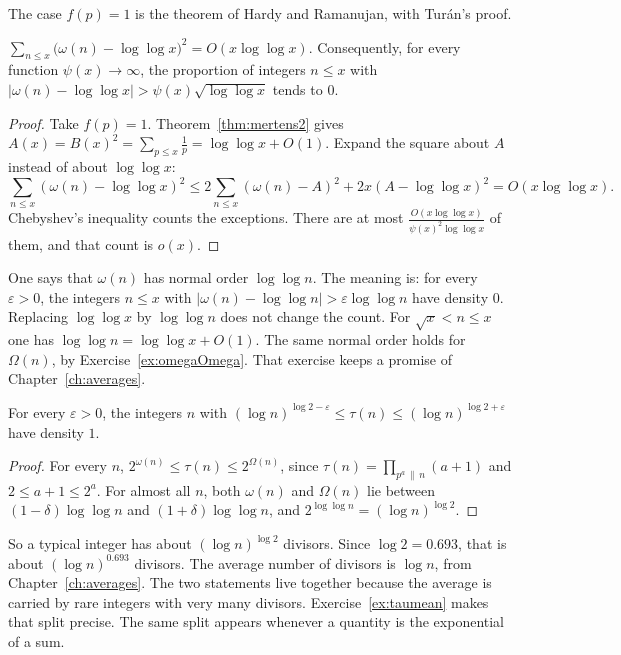 The case $f(p)=1$ is the theorem of Hardy and Ramanujan, with Turán's proof.

\begin{theorem}\label{thm:hr}
$\displaystyle\sum_{n\le x}\bigl(\omega(n)-\log\log x\bigr)^2=O(x\log\log x)$. Consequently, for every function $\psi(x)\to\infty$, the proportion of integers $n\le x$ with $|\omega(n)-\log\log x|>\psi(x)\sqrt{\log\log x}$ tends to $0$.
\end{theorem}
\begin{proof}
Take $f(p)=1$. Theorem~\ref{thm:mertens2} gives $A(x)=B(x)^2=\sum_{p\le x}\frac1p=\log\log x+O(1)$. Expand the square about $A$ instead of about $\log\log x$:
\[
\sum_{n\le x}(\omega(n)-\log\log x)^2\le 2\sum_{n\le x}(\omega(n)-A)^2+2x(A-\log\log x)^2=O(x\log\log x).
\]
Chebyshev's inequality counts the exceptions. There are at most $\frac{O(x\log\log x)}{\psi(x)^2\log\log x}$ of them, and that count is $o(x)$.
\end{proof}

One says that $\omega(n)$ has normal order $\log\log n$. The meaning is: for every $\varepsilon>0$, the integers $n\le x$ with $|\omega(n)-\log\log n|>\varepsilon\log\log n$ have density $0$. Replacing $\log\log x$ by $\log\log n$ does not change the count. For $\sqrt x<n\le x$ one has $\log\log n=\log\log x+O(1)$. The same normal order holds for $\Omega(n)$, by Exercise~\ref{ex:omegaOmega}. That exercise keeps a promise of Chapter~\ref{ch:averages}.

\begin{corollary}\label{cor:taunormal}
For every $\varepsilon>0$, the integers $n$ with $(\log n)^{\log2-\varepsilon}\le\tau(n)\le(\log n)^{\log2+\varepsilon}$ have density $1$.
\end{corollary}
\begin{proof}
For every $n$, $2^{\omega(n)}\le\tau(n)\le2^{\Omega(n)}$, since $\tau(n)=\prod_{p^a\,\|\,n}(a+1)$ and $2\le a+1\le2^a$. For almost all $n$, both $\omega(n)$ and $\Omega(n)$ lie between $(1-\delta)\log\log n$ and $(1+\delta)\log\log n$,
and $2^{\log\log n}=(\log n)^{\log2}$.
\end{proof}

So a typical integer has about $(\log n)^{\log 2}$ divisors. Since $\log 2=0.693$, that is about $(\log n)^{0.693}$ divisors. The average number of divisors is $\log n$, from Chapter~\ref{ch:averages}. The two statements live together because the average is carried by rare integers with very many divisors. Exercise~\ref{ex:taumean} makes that split precise. The same split appears whenever a quantity is the exponential of a sum.

